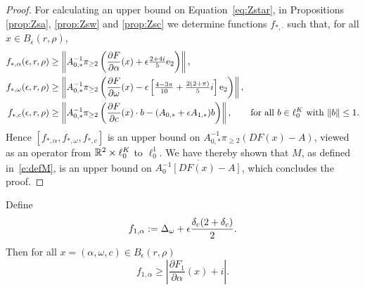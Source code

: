 \begin{proof}
	
	For calculating an upper bound on Equation~\eqref{eq:Zstar}, in Propositions  \ref{prop:Zsa}, \ref{prop:Zsw}  and \ref{prop:Zsc} we  determine functions $f_{*,\cdot}$ such that, for all $x \in B_\epsilon(r,\rho)$,   
	\begin{alignat*}{1}
	f_{*,\alpha} (\epsilon,r,\rho)&\geq  \left\| A_{0,*}^{-1}  \pi_{\geq 2} \left(
	\frac{\partial F}{\partial \alpha}(x)  +    \epsilon  \tfrac{2 +4 i}{5} \e_2  \right) \right\| , \\
%
	f_{*,\omega} (\epsilon,r,\rho)&\geq  \left\| A_{0,*}^{-1}  \pi_{\geq 2}\left( \frac{\partial F}{\partial \omega}(x) -  \epsilon \left[ \tfrac{4-3\pi}{10} + \tfrac{2(2 + \pi)}{5}i \right] \e_2  \right) \right\| ,  \\
	f_{*,c} (\epsilon,r,\rho) &\geq    \left\|  A_{0,*}^{-1} \pi_{\geq 2} \left( \frac{\partial F}{\partial c}(x) \cdot b  - (A_{0,*} + \epsilon A_{1,*}) b \right) 
	\right\| , \qquad\text{for all $b\in\ell^K_0$ with $\|b\| \leq 1$}.
	\end{alignat*}
	Hence $ [ f_{*,\alpha} , f_{*,\omega}, f_{*,c}]$ is an upper bound on $A_{0,*}^{-1}  \pi_{\geq 2} \left( D F( x) - A \right)$, viewed as an operator from $\mathbb{R}^2 \times \ell^K_0$ to $\ell^1_0$. 
		We have thereby shown that $M$, as defined in~\eqref{e:defM}, is an upper bound on $\overline{A_0^{-1}  \left[D F( x ) - A \right] }$, which concludes the proof.	
\end{proof}










\begin{proposition}
	\label{prop:Z1a}
	Define
	\[
	f_{1,\alpha} :=  \Delta_\omega +  \epsilon \frac{\delta_c  (2 + \delta_c) }{2} .
	\]
	Then for all $x = (\alpha,\omega,c) \in B_\epsilon(r,\rho)$ 
	\[
	f_{1,\alpha} \geq   \left|  \frac{\partial F_1}{\partial \alpha} (x) + i  \right| .
	\]
\end{proposition}





